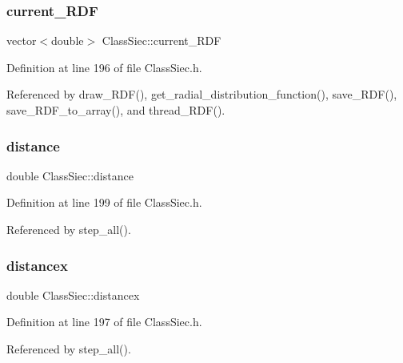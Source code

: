\mbox{\label{classClassSiec_aaa4641c3eb550d26c64a785729e8cd63}} 
\subsubsection{\texorpdfstring{current\+\_\+\+R\+DF}{current\_RDF}}
{\footnotesize\ttfamily vector$<$double$>$ Class\+Siec\+::current\+\_\+\+R\+DF}



Definition at line 196 of file Class\+Siec.\+h.



Referenced by draw\+\_\+\+R\+D\+F(), get\+\_\+radial\+\_\+distribution\+\_\+function(), save\+\_\+\+R\+D\+F(), save\+\_\+\+R\+D\+F\+\_\+to\+\_\+array(), and thread\+\_\+\+R\+D\+F().

\mbox{\label{classClassSiec_a4593ac900fa92dd33f9b40010b35efb9}} 
\subsubsection{\texorpdfstring{distance}{distance}}
{\footnotesize\ttfamily double Class\+Siec\+::distance}



Definition at line 199 of file Class\+Siec.\+h.



Referenced by step\+\_\+all().

\mbox{\label{classClassSiec_a98e9ee22a2e12ce6612d1ce6e785cda2}} 
\subsubsection{\texorpdfstring{distancex}{distancex}}
{\footnotesize\ttfamily double Class\+Siec\+::distancex}



Definition at line 197 of file Class\+Siec.\+h.



Referenced by step\+\_\+all().


